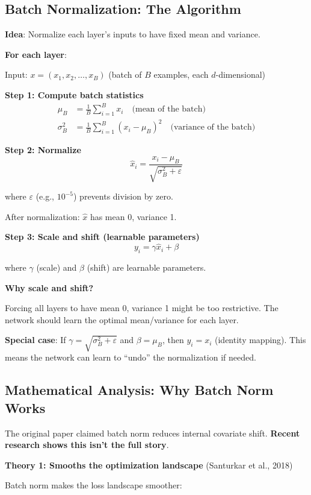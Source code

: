 \documentclass[11pt,oneside]{book}
\begin{document}
\subsection{Batch Normalization: The Algorithm}

\textbf{Idea}: Normalize each layer's inputs to have fixed mean and variance.

\textbf{For each layer}:

Input: $x = (x_1, x_2, \ldots, x_B)$ (batch of $B$ examples, each $d$-dimensional)

\textbf{Step 1: Compute batch statistics}
\begin{align*}
\mu_B &= \frac{1}{B} \sum_{i=1}^B x_i \quad \text{(mean of the batch)} \\
\sigma_B^2 &= \frac{1}{B} \sum_{i=1}^B (x_i - \mu_B)^2 \quad \text{(variance of the batch)}
\end{align*}

\textbf{Step 2: Normalize}
\[
\hat{x}_i = \frac{x_i - \mu_B}{\sqrt{\sigma_B^2 + \varepsilon}}
\]

where $\varepsilon$ (e.g., $10^{-5}$) prevents division by zero.

After normalization: $\hat{x}$ has mean 0, variance 1.

\textbf{Step 3: Scale and shift (learnable parameters)}
\[
y_i = \gamma \hat{x}_i + \beta
\]

where $\gamma$ (scale) and $\beta$ (shift) are learnable parameters.

\textbf{Why scale and shift?}

Forcing all layers to have mean 0, variance 1 might be too restrictive. The network should learn the optimal mean/variance for each layer.

\textbf{Special case}: If $\gamma = \sqrt{\sigma_B^2 + \varepsilon}$ and $\beta = \mu_B$, then $y_i = x_i$ (identity mapping). This means the network can learn to ``undo'' the normalization if needed.

\subsection{Mathematical Analysis: Why Batch Norm Works}

The original paper claimed batch norm reduces internal covariate shift. \textbf{Recent research shows this isn't the full story}.

\textbf{Theory 1: Smooths the optimization landscape} (Santurkar et al., 2018)

Batch norm makes the loss landscape smoother:
\end{document}
